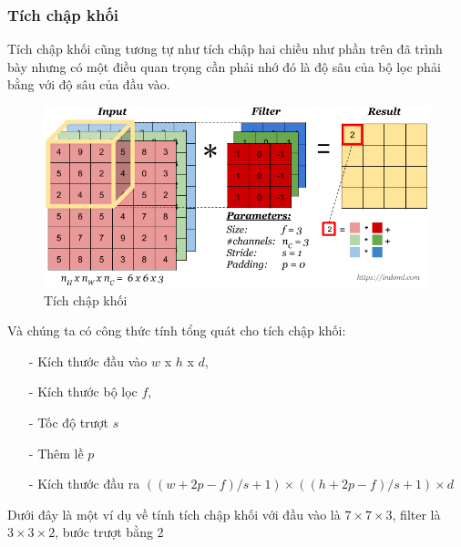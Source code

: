 \subsubsection{Tích chập khối}
Tích chập khối cũng tương tự như tích chập hai chiều như phần trên đã trình bày nhưng có một điều quan trọng cần phải nhớ đó là độ sâu của bộ lọc phải bằng với độ sâu của đầu vào.
\begin{figure}[H]
	\begin{center}
		\includegraphics[scale=0.3]{chap3/image/cnn/convolution-operation-on-volume5.png}
	\end{center}
	\caption{Tích chập khối  \protect \footnotemark}
	\label{fig:padding}
\end{figure}
Và chúng ta có công thức tính tổng quát cho tích chập khối:
\begin{itemize}
	\item[-] Kích thước đầu vào \textbf{$w$} x \textbf{$h$} x \textbf{$d$},
	\item[-] Kích thước bộ lọc \textbf{$f$},	
	\item[-] Tốc độ trượt \textbf{$s$}
	\item[-] Thêm lề \textbf{$p$}
	\item[-] Kích thước đầu ra $((w+2p-f)/s +1) \times ((h+2p-f)/s +1) \times d$ 
\end{itemize}
Dưới đây là một ví dụ về tính tích chập khối với đầu vào là $7\times 7 \times 3$, filter là $3\times 3\times2$, bước trượt bằng 2
